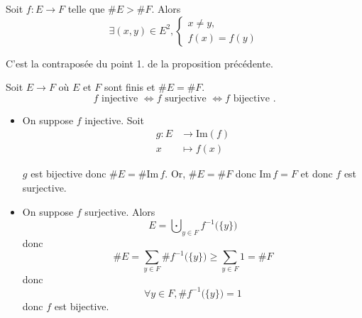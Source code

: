 \begin{prop}
	Soit $f: E \to F$ telle que $\#E > \#F$. Alors \[
		\exists (x,y) \in E^2, \begin{cases}
			x \neq y,\\
			f(x) = f(y)
		\end{cases}
	\]
\end{prop}

\begin{prv}
	C'est la contraposée du point 1. de la proposition précédente.
\end{prv}

\begin{prop}
	Soit $E \to F$ où $E$ et $F$ sont finis et $\#E = \#F$.\[
		f \text{ injective } \iff f \text{ surjective } \iff f \text{ bijective }.
	\]
\end{prop}

\begin{prv}
	\begin{itemize}
		\item On suppose $f$ injective. Soit \begin{align*}
				g: E &\longrightarrow \mathrm{Im}(f) \\
				x &\longmapsto f(x)
			\end{align*}

			$g$ est bijective donc $\#E=\#\mathrm{Im}\,f$. Or, $\#E = \#F$ donc $\mathrm{Im}\,f = F$ et donc $f$ est surjective.
		\item On suppose $f$ surjective. Alors \[
			E = \bigcupdot_{y \in F} f^{-1}\big(\{y\}\big)
		\] donc \[
			\#E = \sum_{y \in F} \#f^{-1}\big(\{y\}\big) \ge \sum_{y\in F}1 = \#F
		\] donc \[
			\forall y \in F, \#f^{-1}\big(\{y\}\big) = 1
		\] donc $f$ est bijective.
	\end{itemize}
\end{prv}
